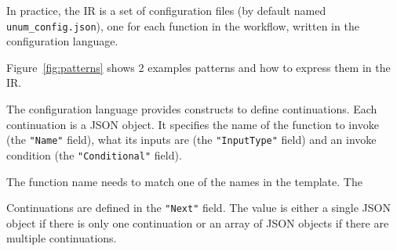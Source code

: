 In practice, the \name{} IR is a set of configuration files (by default named
\texttt{unum\_config.json}), one for each function in the workflow, written in
the \name{} configuration language.

Figure~\ref{fig:patterns} shows 2 examples patterns and how to express them in
the \name{} IR.

The configuration language provides constructs to define continuations. Each
continuation is a JSON object. It specifies the name of the function to invoke
(the \texttt{"Name"} field), what its inputs are (the \texttt{"InputType"}
field) and an invoke condition (the \texttt{"Conditional"} field).

The function name needs to match one of the names in the \name{} template. The 

Continuations are defined in the \texttt{"Next"} field. The value is
either a single JSON object if there is only one continuation or an array
of JSON objects if there are multiple continuations.


